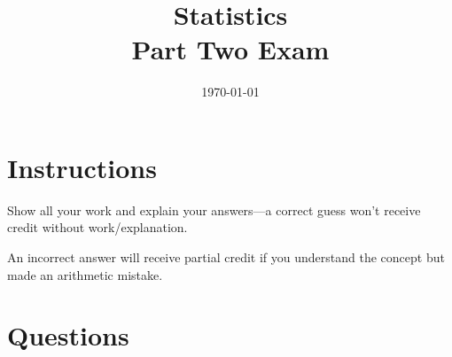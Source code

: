 \documentclass[letterpaper, landscape]{exam}
\title{Statistics \\ Part Two Exam}
\date{\today}
\author{}
\begin{document}
  \maketitle

  \begin{center}
    \gradetable[h][pages]
  \end{center}

  \ifprintanswers{}
  \else
  \section{Instructions}
  Show all your work and explain your answers---a correct guess won't receive
  credit without work/explanation. 
  
  An incorrect answer will receive partial credit if you understand the
  concept but made an arithmetic mistake.

  \fi

  \section{Questions}
\end{document}
